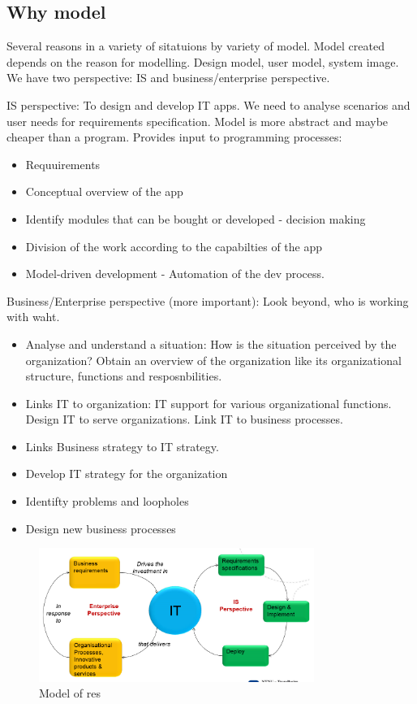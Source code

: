 \subsection{Why model}
Several reasons in a variety of sitatuions by variety of model. Model created depends on the reason for modelling. Design model, user model, system image.
We have two perspective: IS and business/enterprise perspective.

IS perspective: To design and develop IT apps. We need to analyse scenarios and user needs for requirements specification. Model is more abstract and maybe cheaper than a program. Provides input to programming processes:
\begin{itemize}
\item Requuirements
\item Conceptual overview of the app
\item Identify modules that can be bought or developed - decision making
\item Division of the work according to the capabilties of the app
\item Model-driven development - Automation of the dev process.
\end{itemize}

Business/Enterprise perspective (more important): Look beyond, who is working with waht.
\begin{itemize}
\item Analyse and understand a situation: How is the situation perceived by the organization? Obtain an overview of the organization like its organizational structure, functions and resposnbilities. 
\item Links IT to organization: IT support for various organizational functions. Design IT to serve organizations. Link IT to business processes.
\item Links Business strategy to IT strategy. 
\item Develop IT strategy for the organization
\item Identifty problems and loopholes
\item Design new business processes
\end{itemize}

\begin{figure}
	\centering
	\includegraphics[width=0.8\textwidth]{images/process.png}
	\caption{Model of res}
	\label{fig:whyModel}
\end{figure}

